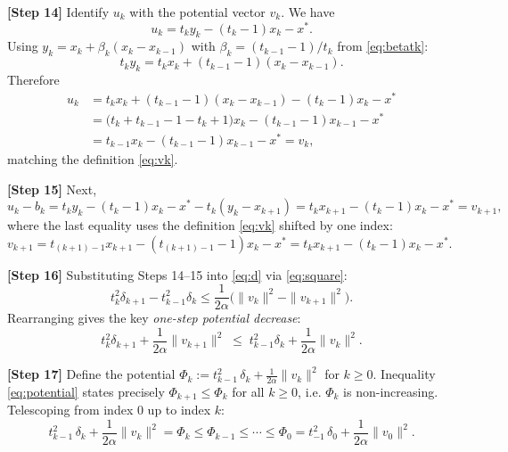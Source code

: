\documentclass{article}
\begin{document}
\textbf{[Step 14]} Identify $u_k$ with the potential vector $v_k$. We have
\[
u_k = t_k y_k - (t_k-1)x_k - x^*.
\]
Using $y_k = x_k + \beta_k(x_k - x_{k-1})$ with
$\beta_k = (t_{k-1}-1)/t_k$ from \eqref{eq:betatk}:
\[
t_k y_k = t_k x_k + (t_{k-1}-1)(x_k - x_{k-1}).
\]
Therefore
\begin{align*}
u_k &= t_k x_k + (t_{k-1}-1)(x_k - x_{k-1}) - (t_k - 1)x_k - x^*\\
    &= \big(t_k + t_{k-1} - 1 - t_k + 1\big)x_k - (t_{k-1}-1)x_{k-1} - x^*\\
    &= t_{k-1}x_k - (t_{k-1}-1)x_{k-1} - x^* = v_k,
\end{align*}
matching the definition \eqref{eq:vk}.

\textbf{[Step 15]} Next,
\[
u_k - b_k = t_k y_k - (t_k-1)x_k - x^* - t_k(y_k - x_{k+1})
= t_k x_{k+1} - (t_k-1)x_k - x^* = v_{k+1},
\]
where the last equality uses the definition \eqref{eq:vk} shifted by one index:
$v_{k+1} = t_{(k+1)-1} x_{k+1} - (t_{(k+1)-1} - 1)x_k - x^*
= t_k x_{k+1} - (t_k - 1)x_k - x^*$.

\textbf{[Step 16]} Substituting Steps 14--15 into \eqref{eq:d} via \eqref{eq:square}:
\[
t_k^2 \delta_{k+1} - t_{k-1}^2 \delta_k
\le \frac{1}{2\alpha}\Big(\|v_k\|^2 - \|v_{k+1}\|^2\Big).
\]
Rearranging gives the key \emph{one-step potential decrease}:
\begin{equation}
t_k^2 \delta_{k+1} + \frac{1}{2\alpha}\|v_{k+1}\|^2
\;\le\; t_{k-1}^2 \delta_k + \frac{1}{2\alpha}\|v_k\|^2. \label{eq:potential}
\end{equation}

\textbf{[Step 17]} Define the potential
$\Phi_k := t_{k-1}^2\,\delta_k + \frac{1}{2\alpha}\|v_k\|^2$ for $k \ge 0$.
Inequality \eqref{eq:potential} states precisely $\Phi_{k+1} \le \Phi_k$ for all
$k \ge 0$, i.e. $\Phi_k$ is non-increasing. Telescoping from index $0$ up to
index $k$:
\begin{equation}
t_{k-1}^2 \,\delta_k + \frac{1}{2\alpha}\|v_k\|^2
= \Phi_k \le \Phi_{k-1} \le \cdots \le \Phi_0
= t_{-1}^2\,\delta_0 + \frac{1}{2\alpha}\|v_0\|^2. \label{eq:tele}
\end{equation}
\end{document}
